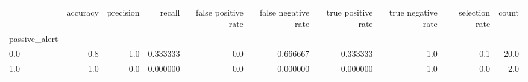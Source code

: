 \begin{tabular}{lrrrrrrrrr}
\toprule
{} &  accuracy &  precision &    recall &  false positive rate &  false negative rate &  true positive rate &  true negative rate &  selection rate &  count \\
passive\_alert &           &            &           &                      &                      &                     &                     &                 &        \\
\midrule
0.0           &       0.8 &        1.0 &  0.333333 &                  0.0 &             0.666667 &            0.333333 &                 1.0 &             0.1 &   20.0 \\
1.0           &       1.0 &        0.0 &  0.000000 &                  0.0 &             0.000000 &            0.000000 &                 1.0 &             0.0 &    2.0 \\
\bottomrule
\end{tabular}
